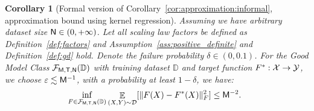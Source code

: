 \documentclass[11pt]{article}
\theoremstyle{plain}
\newtheorem{corollary}[theorem]{Corollary}
\DeclareMathOperator*{\E}{{\mathbb{E}}}
\begin{document}
\begin{corollary}
    [Formal version of Corollary~\ref{cor:approximation:informal}, approximation bound using kernel regression]\label{cor:approximation}
    Assuming we have arbitrary dataset size ${\sf N} \in (0, +\infty)$. Let all scaling law factors be defined as Definition~\ref{def:factors} and Assumption~\ref{ass:positive_definite} and Definition~\ref{def:gd} hold. Denote the failure probability $\delta \in (0, 0.1)$. For the Good Model Class $ {\cal F}_{\sf M, T, N}(\mathbb{D})$ with training dataset $\mathbb{D}$ and target function $F^*: {\cal X} \to {\cal Y}$, we choose $\varepsilon \lesssim {\sf M}^{-1}$, with a probability at least $1 - \delta$, we have:
    \begin{align*}
        & ~ \inf_{F \in {\cal F}_{\sf M, T, N}(\mathbb{D})} \E_{(X, Y) \sim \mathcal{D}}[ \| F(X) - F^*(X)\|_F^2 ] \le {\sf M}^{-2}.
    \end{align*}
\end{corollary}
\end{document}
